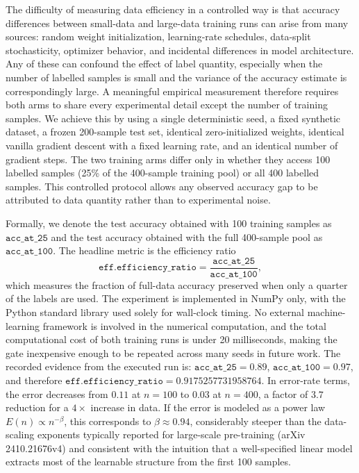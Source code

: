 \documentclass[10pt]{article}
\begin{document}
The difficulty of measuring data efficiency in a controlled way is that accuracy differences between small-data and large-data training runs can arise from many sources: random weight initialization, learning-rate schedules, data-split stochasticity, optimizer behavior, and incidental differences in model architecture. Any of these can confound the effect of label quantity, especially when the number of labelled samples is small and the variance of the accuracy estimate is correspondingly large. A meaningful empirical measurement therefore requires both arms to share every experimental detail except the number of training samples. We achieve this by using a single deterministic seed, a fixed synthetic dataset, a frozen 200-sample test set, identical zero-initialized weights, identical vanilla gradient descent with a fixed learning rate, and an identical number of gradient steps. The two training arms differ only in whether they access 100 labelled samples (25\% of the 400-sample training pool) or all 400 labelled samples. This controlled protocol allows any observed accuracy gap to be attributed to data quantity rather than to experimental noise.

Formally, we denote the test accuracy obtained with 100 training samples as \(\texttt{acc\_at\_25}\) and the test accuracy obtained with the full 400-sample pool as \(\texttt{acc\_at\_100}\). The headline metric is the efficiency ratio
\[
\texttt{eff.efficiency\_ratio} = \frac{\texttt{acc\_at\_25}}{\texttt{acc\_at\_100}},
\]
which measures the fraction of full-data accuracy preserved when only a quarter of the labels are used. The experiment is implemented in NumPy only, with the Python standard library used solely for wall-clock timing. No external machine-learning framework is involved in the numerical computation, and the total computational cost of both training runs is under 20 milliseconds, making the gate inexpensive enough to be repeated across many seeds in future work. The recorded evidence from the executed run is: \(\texttt{acc\_at\_25} = 0.89\), \(\texttt{acc\_at\_100} = 0.97\), and therefore \(\texttt{eff.efficiency\_ratio} = 0.9175257731958764\). In error-rate terms, the error decreases from \(0.11\) at \(n=100\) to \(0.03\) at \(n=400\), a factor of \(3.7\) reduction for a \(4\times\) increase in data. If the error is modeled as a power law \(E(n) \propto n^{-\beta}\), this corresponds to \(\beta \approx 0.94\), considerably steeper than the data-scaling exponents typically reported for large-scale pre-training (arXiv 2410.21676v4) and consistent with the intuition that a well-specified linear model extracts most of the learnable structure from the first 100 samples.
\end{document}
